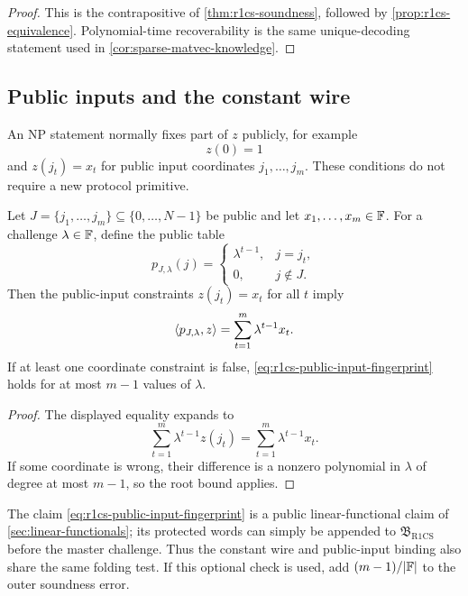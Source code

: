 \begin{proof}
This is the contrapositive of \cref{thm:r1cs-soundness}, followed by \cref{prop:r1cs-equivalence}.  Polynomial-time recoverability is the same unique-decoding statement used in \cref{cor:sparse-matvec-knowledge}.
\end{proof}

\subsection{Public inputs and the constant wire}
\label{sec:r1cs-public-inputs}

An NP statement normally fixes part of $z$ publicly, for example
\[
  z(0)=1
\]
and $z(j_t)=x_t$ for public input coordinates $j_1,\ldots,j_m$.  These conditions do not require a new protocol primitive.

\begin{proposition}
\label{prop:r1cs-public-coordinates}
Let $J=\{j_1,\ldots,j_m\}\subseteq\{0,\ldots,N-1\}$ be public and let $x_1,\ldots,x_m\in\mathbb{F}$.  For a challenge $\lambda\in\mathbb{F}$, define the public table
\begin{equation}
  p_{J,\lambda}(j)
  =\begin{cases}
    \lambda^{t-1},&j=j_t,\\
    0,&j\notin J.
  \end{cases}
  \label{eq:r1cs-public-selector-table}
\end{equation}
Then the public-input constraints $z(j_t)=x_t$ for all $t$ imply
\begin{equation}
  \left\langle p_{J,\lambda},z\right\rangle
  =\sum_{t=1}^{m}\lambda^{t-1}x_t.
  \label{eq:r1cs-public-input-fingerprint}
\end{equation}
If at least one coordinate constraint is false, \eqref{eq:r1cs-public-input-fingerprint} holds for at most $m-1$ values of $\lambda$.
\end{proposition}

\begin{proof}
The displayed equality expands to
\[
  \sum_{t=1}^{m}\lambda^{t-1}z(j_t)
  =\sum_{t=1}^{m}\lambda^{t-1}x_t.
\]
If some coordinate is wrong, their difference is a nonzero polynomial in $\lambda$ of degree at most $m-1$, so the root bound applies.
\end{proof}

The claim \eqref{eq:r1cs-public-input-fingerprint} is a public linear-functional claim of \cref{sec:linear-functionals}; its protected words can simply be appended to $\mathfrak B_{\mathrm{R1CS}}$ before the master challenge.  Thus the constant wire and public-input binding also share the same folding test.  If this optional check is used, add $(m-1)/|\mathbb{F}|$ to the outer soundness error.


